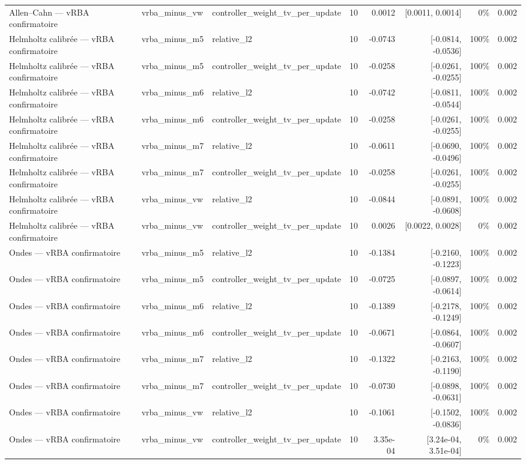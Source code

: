 \begin{tabular}{llllrrrr}
Allen–Cahn — vRBA confirmatoire & vrba\_minus\_vw & controller\_weight\_tv\_per\_update & 10 & 0.0012 & [0.0011, 0.0014] & 0\% & 0.002 \\
Helmholtz calibrée — vRBA confirmatoire & vrba\_minus\_m5 & relative\_l2 & 10 & -0.0743 & [-0.0814, -0.0536] & 100\% & 0.002 \\
Helmholtz calibrée — vRBA confirmatoire & vrba\_minus\_m5 & controller\_weight\_tv\_per\_update & 10 & -0.0258 & [-0.0261, -0.0255] & 100\% & 0.002 \\
Helmholtz calibrée — vRBA confirmatoire & vrba\_minus\_m6 & relative\_l2 & 10 & -0.0742 & [-0.0811, -0.0544] & 100\% & 0.002 \\
Helmholtz calibrée — vRBA confirmatoire & vrba\_minus\_m6 & controller\_weight\_tv\_per\_update & 10 & -0.0258 & [-0.0261, -0.0255] & 100\% & 0.002 \\
Helmholtz calibrée — vRBA confirmatoire & vrba\_minus\_m7 & relative\_l2 & 10 & -0.0611 & [-0.0690, -0.0496] & 100\% & 0.002 \\
Helmholtz calibrée — vRBA confirmatoire & vrba\_minus\_m7 & controller\_weight\_tv\_per\_update & 10 & -0.0258 & [-0.0261, -0.0255] & 100\% & 0.002 \\
Helmholtz calibrée — vRBA confirmatoire & vrba\_minus\_vw & relative\_l2 & 10 & -0.0844 & [-0.0891, -0.0608] & 100\% & 0.002 \\
Helmholtz calibrée — vRBA confirmatoire & vrba\_minus\_vw & controller\_weight\_tv\_per\_update & 10 & 0.0026 & [0.0022, 0.0028] & 0\% & 0.002 \\
Ondes — vRBA confirmatoire & vrba\_minus\_m5 & relative\_l2 & 10 & -0.1384 & [-0.2160, -0.1223] & 100\% & 0.002 \\
Ondes — vRBA confirmatoire & vrba\_minus\_m5 & controller\_weight\_tv\_per\_update & 10 & -0.0725 & [-0.0897, -0.0614] & 100\% & 0.002 \\
Ondes — vRBA confirmatoire & vrba\_minus\_m6 & relative\_l2 & 10 & -0.1389 & [-0.2178, -0.1249] & 100\% & 0.002 \\
Ondes — vRBA confirmatoire & vrba\_minus\_m6 & controller\_weight\_tv\_per\_update & 10 & -0.0671 & [-0.0864, -0.0607] & 100\% & 0.002 \\
Ondes — vRBA confirmatoire & vrba\_minus\_m7 & relative\_l2 & 10 & -0.1322 & [-0.2163, -0.1190] & 100\% & 0.002 \\
Ondes — vRBA confirmatoire & vrba\_minus\_m7 & controller\_weight\_tv\_per\_update & 10 & -0.0730 & [-0.0898, -0.0631] & 100\% & 0.002 \\
Ondes — vRBA confirmatoire & vrba\_minus\_vw & relative\_l2 & 10 & -0.1061 & [-0.1502, -0.0836] & 100\% & 0.002 \\
Ondes — vRBA confirmatoire & vrba\_minus\_vw & controller\_weight\_tv\_per\_update & 10 & 3.35e-04 & [3.24e-04, 3.51e-04] & 0\% & 0.002 \\
\bottomrule
\end{tabular}
